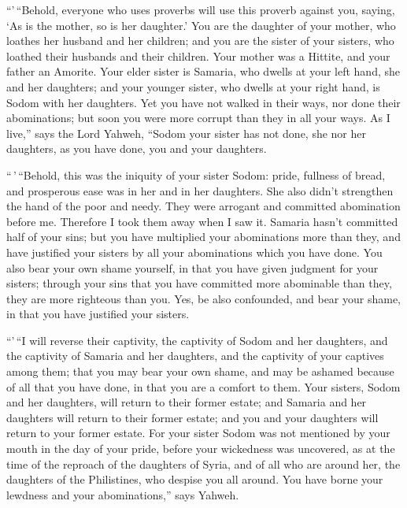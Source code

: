  ``'\,``Behold, everyone who uses proverbs will use this
proverb against you, saying, `As is the mother, so is her daughter.'
 You are the daughter of your mother, who loathes her
husband and her children; and you are the sister of your sisters, who
loathed their husbands and their children. Your mother was a Hittite,
and your father an Amorite.  Your elder sister is
Samaria, who dwells at your left hand, she and her daughters; and your
younger sister, who dwells at your right hand, is Sodom with her
daughters.  Yet you have not walked in their ways, nor
done their abominations; but soon you were more corrupt than they in all
your ways.  As I live,'' says the Lord Yahweh, ``Sodom
your sister has not done, she nor her daughters, as you have done, you
and your daughters.

 ``\,'\,``Behold, this was the iniquity of your sister
Sodom: pride, fullness of bread, and prosperous ease was in her and in
her daughters. She also didn't strengthen the hand of the poor and
needy.  They were arrogant and committed abomination
before me. Therefore I took them away when I saw it. 
Samaria hasn't committed half of your sins; but you have multiplied your
abominations more than they, and have justified your sisters by all your
abominations which you have done.  You also bear your own
shame yourself, in that you have given judgment for your sisters;
through your sins that you have committed more abominable than they,
they are more righteous than you. Yes, be also confounded, and bear your
shame, in that you have justified your sisters.

 ``'\,``I will reverse their captivity, the captivity of
Sodom and her daughters, and the captivity of Samaria and her daughters,
and the captivity of your captives among them;  that you
may bear your own shame, and may be ashamed because of all that you have
done, in that you are a comfort to them.  Your sisters,
Sodom and her daughters, will return to their former estate; and Samaria
and her daughters will return to their former estate; and you and your
daughters will return to your former estate.  For your
sister Sodom was not mentioned by your mouth in the day of your pride,
 before your wickedness was uncovered, as at the time of
the reproach of the daughters of Syria, and of all who are around her,
the daughters of the Philistines, who despise you all around.
 You have borne your lewdness and your abominations,''
says Yahweh.

